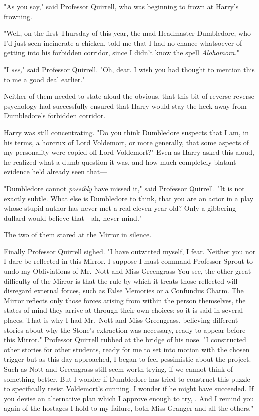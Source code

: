 "As you say," said Professor Quirrell, who was beginning to frown at Harry's
frowning.

"Well, on the first Thursday of this year, the mad Headmaster Dumbledore, who
I'd just seen incinerate a chicken, told me that I had no chance whatsoever of
getting into his forbidden corridor, since I didn't know the spell
\emph{Alohomora.}"

"I \emph{see,}" said Professor Quirrell. "Oh, dear. I wish you had thought to
mention this to me a good deal earlier."

Neither of them needed to state aloud the obvious, that this bit of reverse
reverse psychology had successfully ensured that Harry would stay the heck away
from Dumbledore's forbidden corridor.

Harry was still concentrating. "Do you think Dumbledore suspects that I am, in
his terms, a horcrux of Lord Voldemort, or more generally, that some aspects of
my personality were copied off Lord Voldemort?" Even as Harry asked this aloud,
he realized what a dumb question it was, and how much completely blatant
evidence he'd already seen that—

"Dumbledore cannot \emph{possibly} have missed it," said Professor Quirrell.
"It is not exactly subtle. What else is Dumbledore to think, that you are an
actor in a play whose stupid author has never met a real eleven-year-old? Only
a gibbering dullard would believe that—ah, never mind."

The two of them stared at the Mirror in silence.

Finally Professor Quirrell sighed. "I have outwitted myself, I fear. Neither
you nor I dare be reflected in this Mirror. I suppose I must command Professor
Sprout to undo my Obliviations of Mr.~Nott and Miss Greengrass{\el} You see,
the other great difficulty of the Mirror is that the rule by which it treats
those reflected will disregard external forces, such as False Memories or a
Confundus Charm. The Mirror reflects only those forces arising from within the
person themselves, the states of mind they arrive at through their own choices;
so it is said in several places. That is why I had Mr.~Nott and Miss
Greengrass, believing different stories about why the Stone's extraction was
necessary, ready to appear before this Mirror." Professor Quirrell rubbed at
the bridge of his nose. "I constructed other stories for other students, ready
for me to set into motion with the chosen trigger{\el} but as this day
approached, I began to feel pessimistic about the project. Such as Nott and
Greengrass still seem worth trying, if we cannot think of something better. But
I wonder if Dumbledore has tried to construct this puzzle to specifically
resist Voldemort's cunning. I wonder if he might have succeeded. If you devise
an alternative plan which I approve enough to try, . And I remind you again of the hostages I hold
to my failure, both Miss Granger and all the others."

